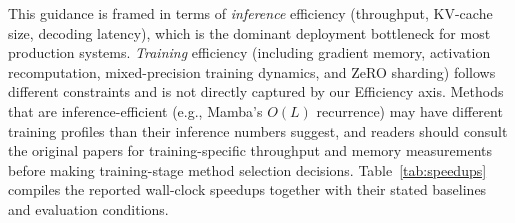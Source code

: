 \documentclass[10pt,twocolumn]{article}
\begin{document}
This guidance is framed in terms of \textit{inference} efficiency (throughput, KV-cache size, decoding latency), which is the dominant deployment bottleneck for most production systems. \textit{Training} efficiency (including gradient memory, activation recomputation, mixed-precision training dynamics, and ZeRO sharding) follows different constraints and is not directly captured by our Efficiency axis. Methods that are inference-efficient (e.g., Mamba's $O(L)$ recurrence) may have different training profiles than their inference numbers suggest, and readers should consult the original papers for training-specific throughput and memory measurements before making training-stage method selection decisions. Table~\ref{tab:speedups} compiles the reported wall-clock speedups together with their stated baselines and evaluation conditions.
\end{document}
